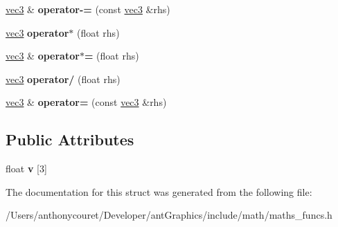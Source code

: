 \begin{DoxyCompactItemize}
\item 
\hypertarget{structvec3_aa94851baf570e3a6b80709dcef11a50a}{\hyperlink{structvec3}{vec3} \& {\bfseries operator-\/=} (const \hyperlink{structvec3}{vec3} \&rhs)}\label{structvec3_aa94851baf570e3a6b80709dcef11a50a}

\item 
\hypertarget{structvec3_a05a4e8fb5c200d94adcde55a56059eb5}{\hyperlink{structvec3}{vec3} {\bfseries operator$\ast$} (float rhs)}\label{structvec3_a05a4e8fb5c200d94adcde55a56059eb5}

\item 
\hypertarget{structvec3_a257f04b0ac3398d3eb642f01e45cb481}{\hyperlink{structvec3}{vec3} \& {\bfseries operator$\ast$=} (float rhs)}\label{structvec3_a257f04b0ac3398d3eb642f01e45cb481}

\item 
\hypertarget{structvec3_af22743e3eb7df2d73305bdf47680b1d9}{\hyperlink{structvec3}{vec3} {\bfseries operator/} (float rhs)}\label{structvec3_af22743e3eb7df2d73305bdf47680b1d9}

\item 
\hypertarget{structvec3_a7abca738940e3cc8810455fd5c8508b2}{\hyperlink{structvec3}{vec3} \& {\bfseries operator=} (const \hyperlink{structvec3}{vec3} \&rhs)}\label{structvec3_a7abca738940e3cc8810455fd5c8508b2}

\end{DoxyCompactItemize}
\subsection*{Public Attributes}
\begin{DoxyCompactItemize}
\item 
\hypertarget{structvec3_ad09608040a1a4e4d026086eff69725d2}{float {\bfseries v} \mbox{[}3\mbox{]}}\label{structvec3_ad09608040a1a4e4d026086eff69725d2}

\end{DoxyCompactItemize}


The documentation for this struct was generated from the following file\+:\begin{DoxyCompactItemize}
\item 
/\+Users/anthonycouret/\+Developer/ant\+Graphics/include/math/maths\+\_\+funcs.\+h\end{DoxyCompactItemize}
